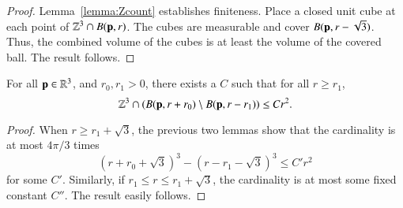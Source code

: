 \begin{proof}  Lemma~\ref{lemma:Zcount} establishes finiteness.  Place a closed unit cube at each point
of $\mathbb{Z}^3\cap B({\mathbf p},r)$.  The cubes are measurable and cover
$B({\mathbf p},r-\sqrt3)$.  Thus, the combined volume of the cubes is at
least the volume of the covered ball.  The result follows.
\end{proof}

\begin{lemma}
For all ${\mathbf p}\in\mathbb{R}^3$, and $r_0,r_1>0$, there exists a $C$ such
that for all $r\ge r_1$, 
    $$
    \mathbb{Z}^3 \cap (B({\mathbf p},r+r_0) \setminus B({\mathbf p},r-r_1)) \le C r^2.
    $$
\end{lemma}

\begin{proof}  When $r \ge r_1+\sqrt3$, the previous two lemmas show
that the cardinality is at most $4\pi/3$ times
    $$(r +r_0 + \sqrt3)^3 - (r - r_1 - \sqrt3)^3 \le C' r^2$$
for some $C'$.  Similarly, if $r_1\le r\le r_1+\sqrt3$, the
cardinality is at most some fixed constant $C''$.  The result
easily follows.
\end{proof}

